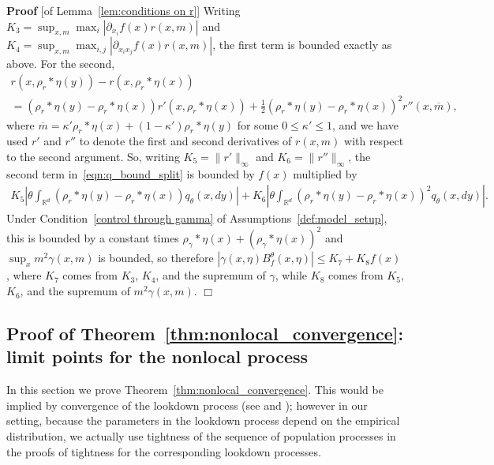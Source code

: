 \documentclass[12pt]{article}
\newenvironment {proof}{{\noindent\bf Proof }}{\hfill $\Box$ \medskip}
\newcommand{\IR}{\mathbb R}
\newcommand{\kernel}{\rho}  %
\newcommand{\smooth}[1]{\kernel_{#1} \! * \!}  %
\numberwithin{equation}{section}
\begin{document}
\begin{proof}[of Lemma~\ref{lem:conditions on r}]
Writing
$K_3 = \sup_{x,m} \max_i |\partial_{x_i} f(x)r(x, m)|$
and 
$K_4 = \sup_{x,m} \max_{i,j} |\partial_{x_i x_j} f(x)r(x, m)|$,
the first term is bounded exactly as above. For the second, 
    \begin{multline*}
        r(x, \smooth{r}\eta(y)) - r(x, \smooth{r}\eta(x))
        \\
        =
        (\smooth{r}\eta(y) - \smooth{r}\eta(x)) r'(x,\smooth{r}\eta(x))
        + \frac{1}{2} (\smooth{r}\eta(y) - \smooth{r}\eta(x))^2 r''(x, \overline{m}),
    \end{multline*}
    where $\overline{m}= \kappa'\smooth{r}\eta(x) +(1-\kappa') 
\smooth{r}\eta(y)$ for some $0\leq \kappa'\leq 1$, and
    we have used $r'$ and $r''$ to denote the first and second derivatives of $r(x,m)$
with respect to the second argument.
    So, writing $K_5=\|r'\|_\infty$ and $K_6=\|r''\|_\infty$,
    the second term in~\eqref{eqn:q_bound_split} is bounded by $f(x)$ multiplied by
    \begin{align*}
       K_5
        \left|
            \theta \int_{\IR^d}
                (\smooth{r}\eta(y) - \smooth{r}\eta(x))
            q_\theta(x, dy)
        \right|
        +
       K_6
        \left|
            \theta \int_{\IR^d}
                (\smooth{r}\eta(y) - \smooth{r}\eta(x))^2
            q_\theta(x, dy)
        \right| .
    \end{align*}
Under Condition~\ref{control through gamma} of 
Assumptions~\ref{def:model_setup}, this is bounded by 
a constant times $\smooth{\gamma}\eta(x)+(\smooth{\gamma}\eta(x))^2$ and 
$\sup_x m^2\gamma(x, m)$ is bounded,
so therefore $|\gamma(x,\eta) B^\theta_f(x,\eta)| \le K_7 + K_8 f(x)$,
where $K_7$ comes from $K_3$, $K_4$, and the supremum of $\gamma$,
while $K_8$ comes from $K_5$, $K_6$, and the supremum of $m^2 \gamma(x,m)$.
\end{proof}


\subsection{Proof of Theorem~\ref{thm:nonlocal_convergence}: limit points for the nonlocal process}
    \label{sec:population_density_proof}

In this section we prove 
Theorem~\ref{thm:nonlocal_convergence}.
This would be implied by convergence of the lookdown process
(see \citet{kurtz/rodrigues:2011} and \citet{etheridge/kurtz:2019});
however in our setting,
because the parameters in the lookdown process
depend on the empirical distribution,
we actually use tightness of the sequence of population processes
in the proofs of tightness for the corresponding lookdown processes.
\end{document}
